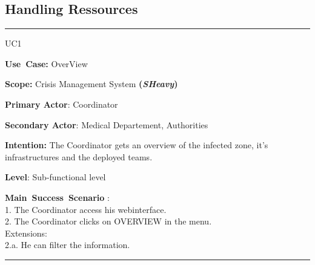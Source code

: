 \subsection{Handling Ressources}
\vspace{0.5cm}
\hrule
\vspace{0.5cm}
\begin{lyxlist}{UC1}
\small{
\item [\textbf{Use~Case:}] OverView
\item [\textbf{Scope:}] Crisis Management System \textbf{(\emph{SHeavy})}
\item [\textbf{Primary Actor}:] Coordinator
\item [\textbf{Secondary Actor}:] Medical Departement, Authorities
\item [\textbf{Intention:}] The Coordinator gets an overview of the infected
zone, it's infrastructures and the deployed teams.
\item [\textbf{Level}:]Sub-functional level
\item [\textbf{Main~Success~Scenario}]:\\
1. The Coordinator access his webinterface.\\
2. The Coordinator clicks on OVERVIEW in the menu.\\
Extensions:\\
	2.a. He can filter the information.\\
}
\end{lyxlist}
\hrule
\vspace{0.5cm} 

